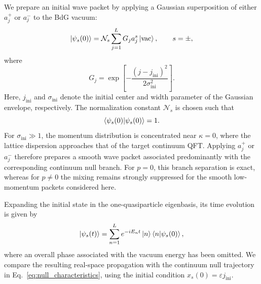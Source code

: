 \documentclass[reprint,amsmath,amssymb,aps,prb,showkeys,superscriptaddress]{revtex4-2}
\begin{document}
We prepare an initial wave packet by applying a Gaussian
superposition of either $a_j^+$ or $a_j^-$ to the BdG vacuum:
\begin{equation}
  \ket{\psi_s(0)}
  =
  \mathcal{N}_s
  \sum_{j=1}^{L}
  G_j a_j^s
  \ket{\mathrm{vac}},
  \qquad
  s=\pm,
  \label{eq:initial_state_a}
\end{equation}
where
\begin{equation}
  G_j
  =
  \exp\left[
    -\frac{(j-j_{\mathrm{ini}})^2}
           {2\sigma_{\mathrm{ini}}^2}
  \right].
  \label{eq:Gaussian_envelope}
\end{equation}
Here, $j_{\mathrm{ini}}$ and $\sigma_{\mathrm{ini}}$ denote the
initial center and width parameter of the Gaussian envelope,
respectively. The normalization constant $\mathcal{N}_s$ is chosen
such that
\begin{equation}
  \braket{\psi_s(0)|\psi_s(0)}=1.
  \label{eq:initial_state_normalization}
\end{equation}
For $\sigma_{\mathrm{ini}}\gg1$, the momentum distribution is
concentrated near $\kappa=0$, where the lattice dispersion
approaches that of the target continuum QFT. Applying $a_j^+$ or
$a_j^-$ therefore prepares a smooth wave packet associated
predominantly with the corresponding continuum null branch. For
$p=0$, this branch separation is exact, whereas for $p\neq0$ the
mixing remains strongly suppressed for the smooth low-momentum
packets considered here.

Expanding the initial state in the one-quasiparticle eigenbasis, its
time evolution is given by
\begin{equation}
  \ket{\psi_s(t)}
  =
  \sum_{n=1}^{L}
  e^{-iE_nt}
  \ket{n}
  \braket{n|\psi_s(0)},
  \label{eq:time_evolved_state}
\end{equation}
where an overall phase associated with the vacuum energy has been
omitted. We compare the resulting real-space propagation with the
continuum null trajectory in Eq.~\eqref{eq:null_characteristics},
using the initial condition
$x_s(0)=\varepsilon j_{\mathrm{ini}}$.
\end{document}
